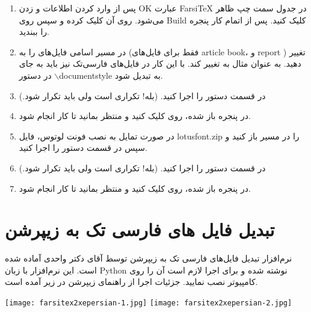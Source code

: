 \begin{enumerate}
\begin{latin}
{\bf Description:} {\Large FarsiTeX }\\
\end{latin}
 قسمت مربوط به  خالی گذاشته شود. 
\item پس از وارد کردن اطلاعات و زدن OK عبارت FarsiTeX در جدول سمت چپ ظاهر می‌شود. روی آن کلیک کرده
و سپس روی Build کلیک کنید. پس از اتمام کار پنجره را ببندید.
\item  در مسیر 
اسامی فایل‌های  را به  (فقط برای فایل‌های article book، و report ) تغییر دهید. به عنوان مثال  به  تغییر کند. با این کار
در فایل‌های فارسی‌تک نیز باید به جای  در دستور $\backslash$documentstyle به  تبدیل شود.
\item  در قسمت  دستور  را اجرا کنید. (بله! تکراری است ولی باید تکرار شود.)
\item  در پنجره باز شده، روی  کلیک کنید و منتظر بمانید تا کار انجام شود.
\item  در صورت تمایل به نصب فونت لوتوس، فایل lotusfont.zip  را در مسیر  
باز کنید و سپس در قسمت   دستور  را اجرا کنید.
\item  در قسمت  دستور  را اجرا کنید. (بله! تکراری است ولی باید تکرار شود.)
\item  در پنجره باز شده، روی  کلیک کنید و منتظر بمانید تا کار انجام شود.

\end{enumerate}
\section{تبدیل فایل های فارسی تک به زیپرشن}

نرم‌افزار تبدیل فایل‌های فارسی تک به زیپرشن توسط آقای دکتر واحدی آماده شده است. این نرم‌افزار با زبان Python نوشته
شده و برای اجرا لازم است آن را روی کامپیوتر نصب نمایید. جزئیات اجرا از راهنمای زیپرشن در زیر آمده است.
\begin{center}
\texttt{[image: farsitex2xepersian-1.jpg]} 
\texttt{[image: farsitex2xepersian-2.jpg]} 
\end{center}

